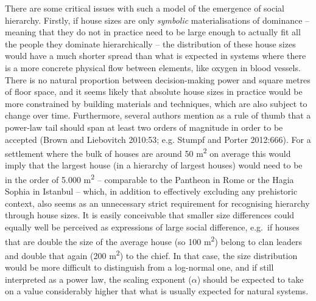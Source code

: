 \documentclass[
  12pt,
]{book}
\begin{document}
There are some critical issues with such a model of the emergence of social hierarchy. Firstly, if house sizes are only \emph{symbolic} materialisations of dominance -- meaning that they do not in practice need to be large enough to actually fit all the people they dominate hierarchically -- the distribution of these house sizes would have a much shorter spread than what is expected in systems where there is a more concrete physical flow between elements, like oxygen in blood vessels. There is no natural proportion between decision-making power and square metres of floor space, and it seems likely that absolute house sizes in practice would be more constrained by building materials and techniques, which are also subject to change over time. Furthermore, several authors mention as a rule of thumb that a power-law tail should span at least two orders of magnitude in order to be accepted (Brown and Liebovitch 2010:53; e.g. Stumpf and Porter 2012:666). For a settlement where the bulk of houses are around 50 m\textsuperscript{2} on average this would imply that the largest house (in a hierarchy of largest houses) would need to be in the order of 5.000 m\textsuperscript{2} -- comparable to the Pantheon in Rome or the Hagia Sophia in Istanbul -- which, in addition to effectively excluding any prehistoric context, also seems as an unnecessary strict requirement for recognising hierarchy through house sizes. It is easily conceivable that smaller size differences could equally well be perceived as expressions of large social difference, e.g.~if houses that are double the size of the average house (so 100 m\textsuperscript{2}) belong to clan leaders and double that again (200 m\textsuperscript{2}) to the chief. In that case, the size distribution would be more difficult to distinguish from a log-normal one, and if still interpreted as a power law, the scaling exponent (\(\alpha\)) should be expected to take on a value considerably higher that what is usually expected for natural systems.
\end{document}
